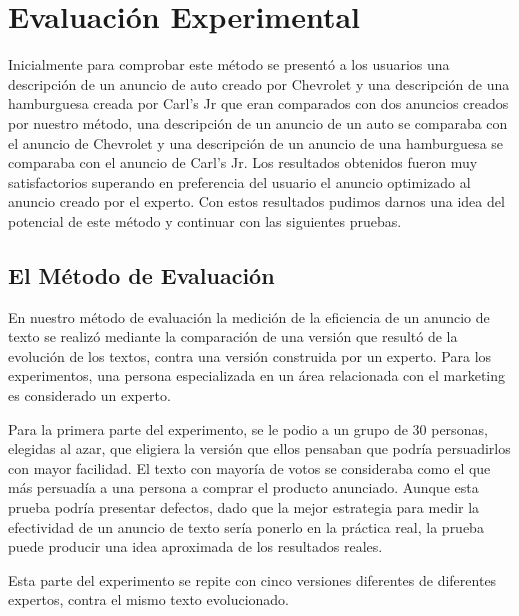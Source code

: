 
\chapter{Evaluación Experimental}

Inicialmente para comprobar este método se presentó a los usuarios una descripción de un anuncio de auto creado por Chevrolet y una descripción de una hamburguesa creada por Carl's Jr que eran comparados con dos anuncios creados por nuestro método, una descripción de un anuncio de un auto se comparaba con el anuncio de Chevrolet y una descripción de un anuncio de una hamburguesa se comparaba con el anuncio de Carl's Jr. Los resultados obtenidos fueron muy satisfactorios superando en preferencia del usuario el anuncio optimizado al anuncio creado por el experto. Con estos resultados pudimos darnos una idea del potencial de este método y continuar con las siguientes pruebas.


\section{El Método de Evaluación}

En nuestro método de evaluación la medición de la eficiencia de un anuncio de texto se realizó mediante la comparación de una versión que resultó de la evolución de los textos, contra una versión construida por un experto. Para los experimentos, una persona especializada en un área relacionada con el marketing es considerado un experto.
 
Para la primera parte del experimento, se le podio a un grupo de 30 personas, elegidas al azar, que eligiera la versión que ellos pensaban que podría persuadirlos con mayor facilidad. El texto con mayoría de votos se consideraba como el que más persuadía a una persona a comprar el producto anunciado. Aunque esta prueba podría presentar defectos, dado que la mejor estrategia para medir la efectividad de un anuncio de texto sería ponerlo en la práctica real, la prueba puede producir una idea aproximada de los resultados reales. 

Esta parte del experimento se repite con cinco versiones diferentes de diferentes expertos, contra el mismo texto evolucionado. 

